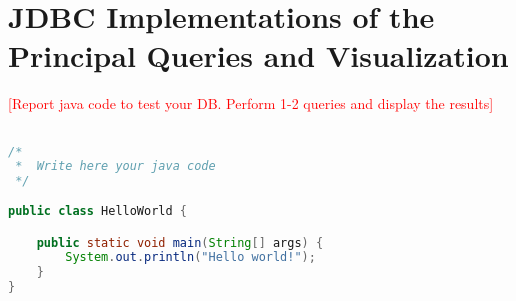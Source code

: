\section{JDBC Implementations of the Principal Queries and Visualization}
\textcolor{red}{[Report java code to test your DB. Perform 1-2 queries and display the results]}

\begin{lstlisting}[language=JAVA,
commentstyle = \color{gray},
keywordstyle = \color{blue}, 
stringstyle = \color{ForestGreen}, 
rulecolor = \color{black},
basicstyle=\ttfamily\footnotesize,
showstringspaces=false]

/* 
 *  Write here your java code
 */ 
  
public class HelloWorld { 

    public static void main(String[] args) { 
        System.out.println("Hello world!");
    }
}
\end{lstlisting}